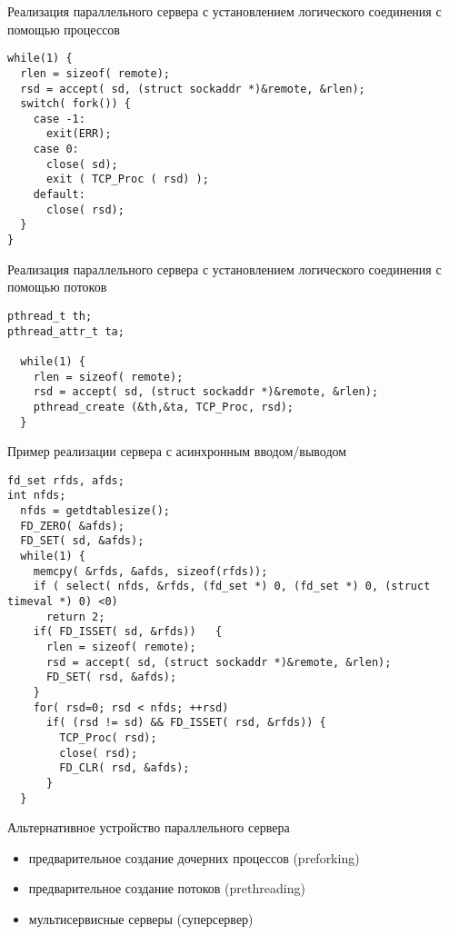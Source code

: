 \begin{frame}[fragile]{Реализация параллельного сервера с установлением логического соединения с помощью процессов}
	\scriptsize	
\begin{lstlisting}[Language=C]
while(1) {
  rlen = sizeof( remote);
  rsd = accept( sd, (struct sockaddr *)&remote, &rlen);
  switch( fork()) {
    case -1:
      exit(ERR);
    case 0:
      close( sd);
      exit ( TCP_Proc ( rsd) );
    default:
      close( rsd);
  }
}
\end{lstlisting}
	\normalsize

\end{frame}

\begin{frame}[fragile]{Реализация параллельного сервера с установлением логического соединения с помощью потоков}
	\scriptsize	
\begin{lstlisting}[Language=C]
pthread_t th;
pthread_attr_t ta;

  while(1) {
    rlen = sizeof( remote);
    rsd = accept( sd, (struct sockaddr *)&remote, &rlen);
    pthread_create (&th,&ta, TCP_Proc, rsd);
  }
\end{lstlisting}
	\normalsize
\end{frame}

\begin{frame}[fragile]{Пример реализации сервера с асинхронным вводом/выводом}
	\scriptsize
\begin{lstlisting}[Language=C]
fd_set rfds, afds;
int nfds;
  nfds = getdtablesize();
  FD_ZERO( &afds);
  FD_SET( sd, &afds);
  while(1) {
    memcpy( &rfds, &afds, sizeof(rfds));	
    if ( select( nfds, &rfds, (fd_set *) 0, (fd_set *) 0, (struct timeval *) 0) <0)
      return 2;
    if( FD_ISSET( sd, &rfds))	{
      rlen = sizeof( remote);
      rsd = accept( sd, (struct sockaddr *)&remote, &rlen);
      FD_SET( rsd, &afds);
    }
    for( rsd=0; rsd < nfds; ++rsd)
      if( (rsd != sd) && FD_ISSET( rsd, &rfds)) {
        TCP_Proc( rsd);
        close( rsd);
        FD_CLR( rsd, &afds);
      }
  }
\end{lstlisting}
	\normalsize

\end{frame}


\begin{frame}{Альтернативное устройство параллельного сервера}

	\begin{itemize}
		\item предварительное создание дочерних процессов (preforking)
		\item предварительное создание потоков (prethreading)
		\item мультисервисные серверы (суперсервер)
	\end{itemize}
\end{frame}

